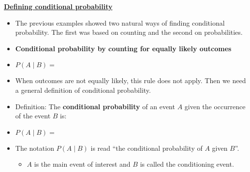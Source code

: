 \documentclass{article}
\newcommand{\bu}[1]{\textbf{\ul{#1}}}			%
\begin{document}
\newpage

\bu{Defining conditional probability}\bigskip

\begin{itemize}
    \item The previous examples showed two natural ways of finding conditional probability. The first was based on counting and the second on probabilities.\\
    \item \textbf{Conditional probability by counting for equally likely outcomes}\bigskip
    \item[] $P(A \mid B) = $\bigskip
    \item[] When outcomes are not equally likely, this rule does not apply. Then we need a general definition of conditional probability.\\
    \item Definition: The \textbf{conditional probability} of an event $A$ given the occurrence of the event $B$ is:\\
    \item[] $P(A \mid B) = $\\
    \item The notation $P(A \mid B)$ is read ``the conditional probability of $A$ given $B$''.
    \begin{itemize}
        \item $A$ is the main event of interest and $B$ is called the conditioning event.
    \end{itemize}
\end{itemize}\bigskip
\end{document}
